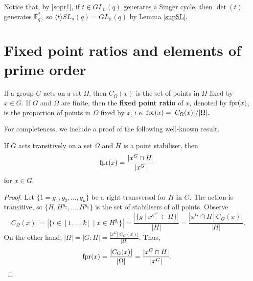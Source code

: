 Notice that, by \eqref{sopr1}, if $t \in GL_n(q)$ generates a Singer cycle, then $\det(t)$ generates $\mathbb{F}_q^*,$ so $\langle t \rangle SL_n(q)=GL_n(q)$ by Lemma \ref{supSL}.



\section{Fixed point ratios and elements of prime order}
\label{fprsec}

\begin{Def}
If a group $G$ acts on a set $\Omega$, then   $C_{\Omega}(x)$ is the set of points in $\Omega$  fixed
by   $x \in G$. If $G$ and $\Omega$ are finite, then  the {\bf fixed point ratio}  of $x$, 
denoted  by ${\mathrm{fpr}}(x)$, is the proportion of points in $\Omega$ fixed by $x$, i.e. ${\mathrm{fpr}}(x) = |C_{\Omega}(x)|/|\Omega|.$
\end{Def}

For completeness, we include a proof of the following well-known result. 

\begin{Lem}\label{fpr}
If  $G$ acts transitively on a set $\Omega$  and $H$ is a point stabiliser,  then 
$${\mathrm{fpr}}(x)= \frac{|x^{G} \cap H|}{|x^G|}$$ for  $x \in G.$
\end{Lem}

\begin{proof}

Let $\{1=g_1, g_2, \ldots , g_k\}$ be a right transversal for  $H$ in $G$. The action is transitive,
so  $\{H, H^{g_2}, \ldots , H^{g_k}\}$ is the set of stabilisers of all points. Observe
$$|C_{\Omega}(x)|=|\{i \in [1, \ldots ,k ] \mid x \in H^{g_i}\}|= \frac{|\{g \mid x^{g^{-1}} \in H\}|}{|H|}=  \frac{|x^G \cap H||C_{G}(x)|}{|H|}.$$
On the other hand, $|\Omega|=|G:H|=\frac{|x^G||C_{G}(x)|}{|H|}.$ Thus,
\begin{equation*}
{\mathrm{fpr}}(x)=\frac{|C_{\Omega}(x)|}{|\Omega|}=\frac{|x^G \cap H|}{|x^G|}. \qedhere 
\end{equation*}
\end{proof}

